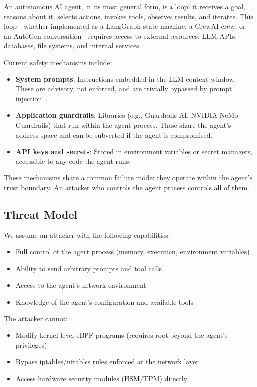 \documentclass[runningheads]{llncs}
\begin{document}
An autonomous AI agent, in its most general form, is a loop: it receives a goal, reasons about it, selects actions, invokes tools, observes results, and iterates. This loop---whether implemented as a LangGraph state machine, a CrewAI crew, or an AutoGen conversation---requires access to external resources: LLM APIs, databases, file systems, and internal services.

Current safety mechanisms include:
\begin{itemize}
\item \textbf{System prompts}: Instructions embedded in the LLM context window. These are advisory, not enforced, and are trivially bypassed by prompt injection~\cite{promptInjection2023,willison2023}.
\item \textbf{Application guardrails}: Libraries (e.g., Guardrails AI, NVIDIA NeMo Guardrails) that run within the agent process. These share the agent's address space and can be subverted if the agent is compromised.
\item \textbf{API keys and secrets}: Stored in environment variables or secret managers, accessible to any code the agent runs.
\end{itemize}

These mechanisms share a common failure mode: they operate within the agent's trust boundary. An attacker who controls the agent process controls all of them.

\subsection{Threat Model}

We assume an attacker with the following capabilities:
\begin{itemize}
\item Full control of the agent process (memory, execution, environment variables)
\item Ability to send arbitrary prompts and tool calls
\item Access to the agent's network environment
\item Knowledge of the agent's configuration and available tools
\end{itemize}

The attacker cannot:
\begin{itemize}
\item Modify kernel-level eBPF programs (requires root beyond the agent's privileges)
\item Bypass iptables/nftables rules enforced at the network layer
\item Access hardware security modules (HSM/TPM) directly
\end{itemize}
\end{document}
